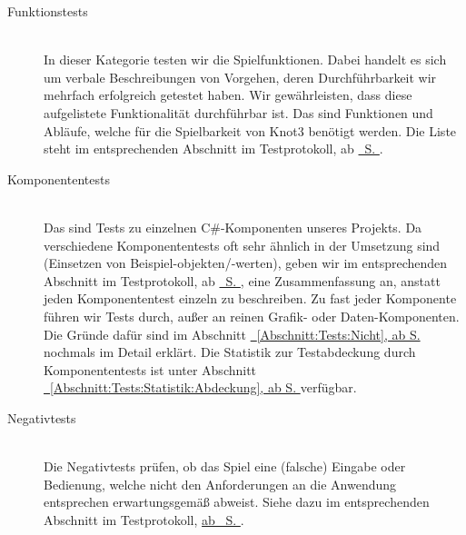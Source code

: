 \begin{description}



	\item[Funktionstests] \hfill
	\\
	
	In dieser Kategorie testen wir die Spielfunktionen. Dabei handelt es sich um verbale Beschreibungen von Vorgehen, deren Durchführbarkeit wir mehrfach erfolgreich getestet haben. Wir gewährleisten, dass diese aufgelistete Funktionalität durchführbar ist. Das sind Funktionen und Abläufe, welche für die Spielbarkeit von Knot3 benötigt werden. Die Liste steht im entsprechenden Abschnitt im Testprotokoll, ab \hyperref[Abschnitt:Tests:Protokoll:Funktion]{\mousecursor~S. \pageref{Abschnitt:Tests:Protokoll:Funktion}}.\\


	
	\item[Komponententests] \hfill
	\\
	
	Das sind Tests zu einzelnen C\#-Komponenten unseres Projekts. Da verschiedene Komponententests oft sehr ähnlich in der Umsetzung sind (Einsetzen von Beispiel-objekten/-werten), geben wir im entsprechenden Abschnitt im Testprotokoll, ab \hyperref[Abschnitt:Tests:Protokoll:Komponenten]{\mousecursor~S. \pageref{Abschnitt:Tests:Protokoll:Komponenten}}, eine Zusammenfassung an, anstatt jeden Komponententest einzeln zu beschreiben.
	Zu fast jeder Komponente führen wir Tests durch, außer an reinen Grafik- oder Daten-Komponenten. Die Gründe dafür sind im Abschnitt \hyperref[Abschnitt:Tests:Nicht]{\mousecursor~\ref{Abschnitt:Tests:Nicht}, ab S. \pageref{Abschnitt:Tests:Nicht}} nochmals im Detail erklärt. Die Statistik zur Testabdeckung durch Komponententests ist unter Abschnitt \hyperref[Abschnitt:Tests:Statistik:Abdeckung]{\mousecursor~\ref{Abschnitt:Tests:Statistik:Abdeckung}, ab S. \pageref{Abschnitt:Tests:Statistik:Abdeckung}} verfügbar.\\


\clearpage



	\item[Negativtests] \hfill
	\\
	
	Die Negativtests prüfen, ob das Spiel eine (falsche) Eingabe oder Bedienung, welche nicht den Anforderungen an die Anwendung entsprechen erwartungsgemäß abweist. Siehe dazu im entsprechenden Abschnitt im Testprotokoll, \hyperref[Abschnitt:Tests:Protokoll:Negativ]{ab \mousecursor~S. \pageref{Abschnitt:Tests:Protokoll:Negativ}}.\\
		


\end{description}
